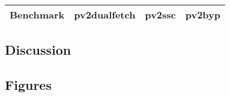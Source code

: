 \documentclass[12pt]{article}
\begin{document}
\begin{center}
    \begin{tabular}{|c || c | c | c|} 
 \hline
 Benchmark & pv2dualfetch & pv2ssc & pv2byp \\
 \hline\hline

 \hline

\end{tabular}
\end{center}

\subsection*{Discussion}

\subsection*{Figures}

\begin{center}
\end{center}

\vspace{0.3cm}

\begin{center}
\end{center}
\end{document}
